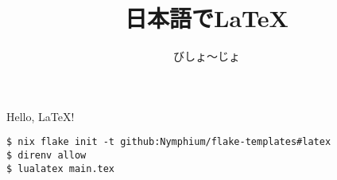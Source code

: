 \documentclass{ltjsarticle}
\title{日本語で\LaTeX }
\author{びしょ～じょ}
\begin{document}
\maketitle
Hello, \LaTeX!

\begin{lstlisting}
$ nix flake init -t github:Nymphium/flake-templates#latex
$ direnv allow
$ lualatex main.tex
\end{lstlisting}
\end{document}

